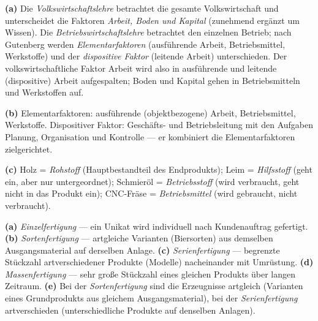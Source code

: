\documentclass[11pt, a4paper]{article}
\begin{document}
\begin{loesung}[title={Lösung Aufgabe~2 --- Produktionsfaktoren nach Gutenberg}]
\textbf{(a)} Die \emph{Volkswirtschaftslehre} betrachtet die gesamte Volkswirtschaft und
unterscheidet die Faktoren \emph{Arbeit, Boden und Kapital} (zunehmend ergänzt um
Wissen). Die \emph{Betriebswirtschaftslehre} betrachtet den einzelnen Betrieb; nach
Gutenberg werden \emph{Elementarfaktoren} (ausführende Arbeit, Betriebsmittel,
Werkstoffe) und der \emph{dispositive Faktor} (leitende Arbeit) unterschieden. Der
volkswirtschaftliche Faktor Arbeit wird also in ausführende und leitende (dispositive)
Arbeit aufgespalten; Boden und Kapital gehen in Betriebsmitteln und Werkstoffen auf.

\textbf{(b)} Elementarfaktoren: ausführende (objektbezogene) Arbeit, Betriebsmittel,
Werkstoffe. Dispositiver Faktor: Geschäfts- und Betriebsleitung mit den Aufgaben
Planung, Organisation und Kontrolle --- er kombiniert die Elementarfaktoren
zielgerichtet.

\textbf{(c)} Holz = \emph{Rohstoff} (Hauptbestandteil des Endprodukts); Leim =
\emph{Hilfsstoff} (geht ein, aber nur untergeordnet); Schmieröl = \emph{Betriebsstoff}
(wird verbraucht, geht nicht in das Produkt ein); CNC-Fräse = \emph{Betriebsmittel}
(wird gebraucht, nicht verbraucht).
\end{loesung}

\begin{loesung}[title={Lösung Aufgabe~3 --- Fertigungstypen}]
\textbf{(a)} \emph{Einzelfertigung} --- ein Unikat wird individuell nach Kundenauftrag
gefertigt.
\textbf{(b)} \emph{Sortenfertigung} --- artgleiche Varianten (Biersorten) aus demselben
Ausgangsmaterial auf derselben Anlage.
\textbf{(c)} \emph{Serienfertigung} --- begrenzte Stückzahl artverschiedener Produkte
(Modelle) nacheinander mit Umrüstung.
\textbf{(d)} \emph{Massenfertigung} --- sehr große Stückzahl eines gleichen Produkts
über langen Zeitraum.
\textbf{(e)} Bei der \emph{Sortenfertigung} sind die Erzeugnisse artgleich (Varianten
eines Grundprodukts aus gleichem Ausgangsmaterial), bei der \emph{Serienfertigung}
artverschieden (unterschiedliche Produkte auf denselben Anlagen).
\end{loesung}
\end{document}
